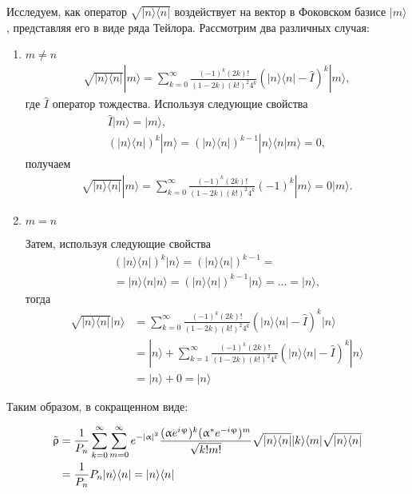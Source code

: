 %
Исследуем, как оператор $\sqrt{|n\rangle\langle n|}$ воздействует на вектор в Фоковском базисе $|m\rangle$, представляя его в виде ряда Тейлора. Рассмотрим два различных случая:
%
\begin{enumerate}
    \item $m \neq n$
    \begin{align}
        \sqrt{|n\rangle\langle n|}|m\rangle = \sum_{k=0}^{\infty} \frac{(-1)^k(2k)!}{(1-2k)(k!)^2 4^k}(|n\rangle\langle n|-\hat{I})^k|m\rangle ,
    \end{align}
    где $\hat{I}$ оператор тождества. Используя следующие свойства
    \begin{gather}
        \hat{I}|m\rangle=|m\rangle, \\
        (|n\rangle\langle n|)^k |m\rangle = (|n\rangle\langle n|)^{k-1} |n\rangle\langle n|m\rangle = 0,
    \end{gather}
    получаем
    \begin{align}
       \sqrt{|n\rangle\langle n|}|m\rangle = \sum_{k=0}^{\infty} \frac{(-1)^k(2k)!}{(1-2k)(k!)^2 4^k}(-1)^k|m\rangle = 0 |m\rangle.
    \end{align}
    \item $m=n$
    
   Затем, используя следующие свойства
    \begin{align}
        (|n\rangle\langle n|)^k |n\rangle = (|n\rangle\langle n|)^{k-1}=\nonumber\\ =|n\rangle\langle n|n\rangle = (|n\rangle\langle n|)^{k-1} |n\rangle = ... = |n\rangle,
    \end{align}
    тогда
    \begin{align}
        \sqrt{|n\rangle\langle n|}|n\rangle &= \sum_{k=0}^{\infty} \frac{(-1)^k(2k)!}{(1-2k)(k!)^2 4^k}(|n\rangle\langle n|-\hat{I})^k|n\rangle \nonumber\\
        &=|n\rangle + \sum_{k=1}^{\infty} \frac{(-1)^k(2k)!}{(1-2k)(k!)^2 4^k}(|n\rangle\langle n|-\hat{I})^k|n\rangle \nonumber\\
        &=|n\rangle + 0 = |n\rangle
    \end{align}
\end{enumerate}

Таким образом, в сокращенном виде:

\begin{equation}
	\begin{aligned}
   		\Tilde{\rho}&=\frac{1}{P_n}\sum_{k=0}^{\infty}\sum_{m=0}^{\infty} e^{-|\alpha|^2} \frac{(\alpha e^{i \varphi})^k(\alpha^{*} e^{-i \varphi})^m}{\sqrt{k!m!}} \sqrt{|n\rangle\langle n|}|k\rangle\langle m |\sqrt{|n\rangle\langle n|} \nonumber \\
  			 &= \frac{1}{P_n} P_n |n\rangle\langle n| = |n\rangle\langle n|	
  	 \label{rhored}
	\end{aligned}
\end{equation}

